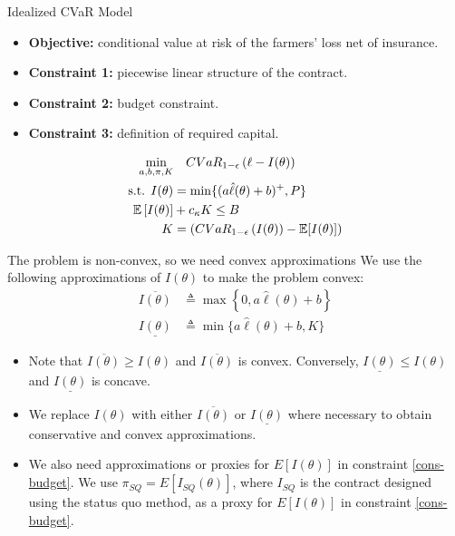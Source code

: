 \documentclass{beamer}
\begin{document}
\begin{frame}{Idealized CVaR Model}
\begin{itemize}
    \item \textbf{Objective:} conditional value at risk of the farmers' loss net of insurance.
    \item  \textbf{Constraint 1:} piecewise linear structure of the contract. 
    \item \textbf{Constraint 2:} budget constraint.
    \item \textbf{Constraint 3:} definition of required capital.
\end{itemize}
 
\begin{align}
        \min_{a,b,\pi, K}  & \quad CVaR_{1-\epsilon}\left ( \ell - I(\theta) \right) \notag\\
        \text{s.t.   }I(\theta) &= \min \{ (a\hat{\ell}(\theta) + b)^+,P \} \\
        \mathbb{E}\left [ I(\theta) \right ] &+ c_{\kappa} K \leq B \\
        K &= \left( CVaR_{1-\epsilon}\left ( I(\theta) \right ) - \mathbb{E}[I(\theta)] \right) \label{cons-budget}
    \end{align}
\end{frame}

\begin{frame}{The problem is non-convex, so we need convex approximations}
\label{convex-approx}
We use the following approximations of $I(\theta)$ to make the problem convex: 
\begin{align*}
    \overline{I(\theta)} &\triangleq \max \left \{ 0,a\hat{\ell}(\theta) + b\right \} \\
    \underline{I(\theta)} &\triangleq \min \{ a\hat{\ell}(\theta) + b,K \}
\end{align*}
\begin{itemize}
    \item Note that $\overline{I(\theta)} \geq I(\theta)$ and $\overline{I(\theta)}$ is convex. Conversely, $\underline{I(\theta)} \leq I(\theta)$ and $\underline{I(\theta)}$ is concave. 
    \item We replace $I(\theta)$ with either $\overline{I(\theta)}$ or $\underline{I(\theta)}$ where necessary to obtain conservative and convex approximations. 
    \item We also need approximations or proxies for $E[I(\theta)]$ in constraint \ref{cons-budget}. We use $\pi_{SQ} = E[I_{SQ}(\theta)]$, where $I_{SQ}$ is the contract designed using the status quo method, as a proxy for $E[I(\theta)]$ in constraint \ref{cons-budget}.
\end{itemize}
\end{frame}
\end{document}
